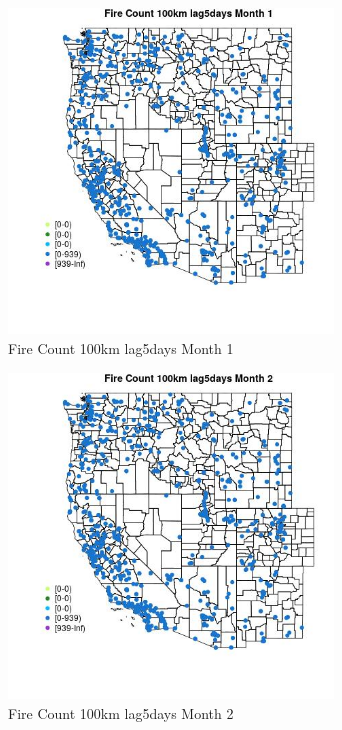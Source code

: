 \begin{figure} 
\centering  
\includegraphics[width=0.77\textwidth]{Code_Outputs/Report_ML_input_PM25_Step4_part_e_de_duplicated_aves_compiled_2019-05-21wNAs_MapObsMo1Fire_Count_100km_lag5days.jpg} 
\caption{\label{fig:Report_ML_input_PM25_Step4_part_e_de_duplicated_aves_compiled_2019-05-21wNAsMapObsMo1Fire_Count_100km_lag5days}Fire Count 100km lag5days Month 1} 
\end{figure} 
 

\begin{figure} 
\centering  
\includegraphics[width=0.77\textwidth]{Code_Outputs/Report_ML_input_PM25_Step4_part_e_de_duplicated_aves_compiled_2019-05-21wNAs_MapObsMo2Fire_Count_100km_lag5days.jpg} 
\caption{\label{fig:Report_ML_input_PM25_Step4_part_e_de_duplicated_aves_compiled_2019-05-21wNAsMapObsMo2Fire_Count_100km_lag5days}Fire Count 100km lag5days Month 2} 
\end{figure} 
 

